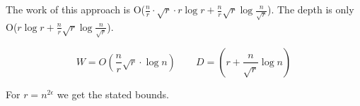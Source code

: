 The work of this approach is O($\frac nr \cdot \sqrt r \cdot r\log r + \frac nr\sqrt r \log \frac{n}{\sqrt r}$). The depth is only O($r\log r + \frac nr\sqrt r \log \frac{n}{\sqrt r}$).

\[W=O(\frac nr \sqrt r \cdot \log n) \qquad D=(r+\frac {n}{\sqrt r} \log n)\]

For $r=n^{2\epsilon}$ we get the stated bounds.